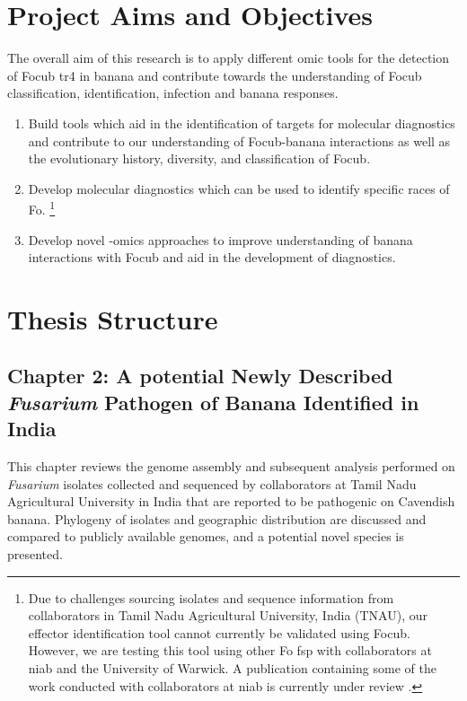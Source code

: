 \newpage
\section{Project Aims and Objectives}

The overall aim of this research is to apply different omic tools for the detection of \acl{Focub} \ac{tr4} in banana and contribute towards the understanding of \acl{Focub} classification, identification, infection and banana responses. 

\begin{enumerate}
    \item Build tools which aid in the identification of targets for molecular diagnostics and contribute to our understanding of \ac{Focub}-banana interactions as well as the evolutionary history, diversity, and classification of \ac{Focub}. 
    \item Develop molecular diagnostics which can be used to identify specific races of \acl{Fo}. \footnote{Due to challenges sourcing isolates and sequence information from collaborators in Tamil Nadu Agricultural University, India (TNAU), our effector identification tool cannot currently be validated using \ac{Focub}. However, we are testing this tool using other \acl{Fo} \ac{fsp} with collaborators at \acl{niab} and the University of Warwick. A publication containing some of the work conducted with collaborators at \acl{niab} is currently under review \parencite{FolaManuscript}.} 
    \item Develop novel -omics approaches to improve understanding of banana interactions with \ac{Focub} and aid in the development of diagnostics.
\end{enumerate}

\newpage
\section{Thesis Structure}

\subsection{Chapter 2: A potential Newly Described \textit{Fusarium} Pathogen of Banana Identified in India} 

This chapter reviews the genome assembly and subsequent analysis performed on \textit{Fusarium} isolates collected and sequenced by collaborators at Tamil Nadu Agricultural University in India that are reported to be pathogenic on Cavendish banana. Phylogeny of isolates and geographic distribution are discussed and compared to publicly available genomes, and a potential novel species is presented. 

